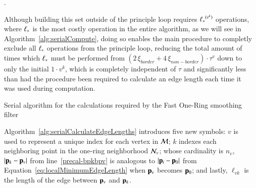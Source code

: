 .%

Although building this set outside of the principle loop requires ${\ell_\ast}^{(v^k)}$ operations, where $\ell_\ast$ is the most costly operation in the entire algorithm, as we will see in Algorithm~\ref{alg:serialCompute}, doing so enables the main procedure to completly exclude all $\ell_\ast$ operations from the principle loop, reducing the total amount of times which $\ell_\ast$ must be performed from ${(2\,\xi_{border} + 4\,\xi_{non-border})\cdot\tau^v}$ down to only the initial $1\cdot v^k$, which is completely independent of $\tau$ and significantly less than had the procedure been required to calculate an edge length each time it was used during computation.%
%

%
%
\begin{algorithm}
	\DontPrintSemicolon


	\bigskip
	\;
\nl	{}
	\caption{Serial algorithm for the calculations required by the Fast One-Ring smoothing filter\label{alg:serialCalculateEdgeLengths}}
\end{algorithm}

Algorithm~\ref{alg:serialCalculateEdgeLengths} introduces five new symbols: $v$ is used to represent a unique index for each vertex in $\mathcal{M}$; $k$ indexes each neighboring point in the one-ring neighborhood $\mathcal{N}_v$; whose cardinality is $n_v$, $|\mathbf{p}_k-\mathbf{p}_v|$ from line~\ref{precal-bpkbpv} is analogous to $|\mathbf{p}_i-\mathbf{p}_0|$ from Equation~\ref{eq:localMinimumEdgeLength} when $\mathbf{p}_v$ becomes $\mathbf{p}_0$; and lastly, $\ell_{vk}$ is the length of the edge between $\mathbf{p}_v$ and $\mathbf{p}_k$.%
%
